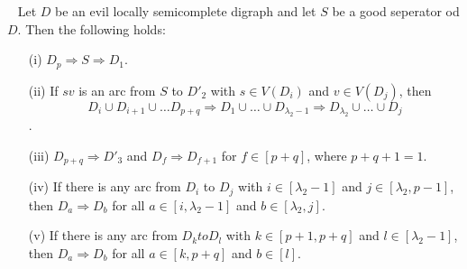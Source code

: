 \begin{lemma}~\cite{tildeDMCS}
    Let $D$ be an evil locally semicomplete digraph and let $S$ be a good seperator od $D$. Then the following holds:
    \begin{itemize}
        \item[(i)] $D_p\Rightarrow S\Rightarrow D_1$.
        \item[(ii)] If $sv$ is an arc from $S$ to $D'_2$ with $s\in V(D_i)$ and $v\in V(D_j)$, then 
        \begin{equation*}
            D_i\cup D_{i+1}\cup \dots D_{p+q}\Rightarrow D_1\cup\dots \cup D_{\lambda_2-1}\Rightarrow D_{\lambda_2}\cup \dots \cup D_j
        \end{equation*}.
        \item[(iii)] $D_{p+q}\Rightarrow D'_3$ and $D_f\Rightarrow D_{f+1}$ for $f\in [p+q]$, where $p+q+1=1$.
        \item[(iv)] If there is any arc from $D_i$ to $D_j$ with $i\in [\lambda_2-1]$ and $j\in [\lambda_2,p-1]$, then $D_a\Rightarrow D_b$ for all $a\in [i,\lambda_2-1]$ and $b\in[\lambda_2,j]$.
        \item[(v)] If there is any arc from $D_k to D_l$ with $k\in [p+1,p+q]$ and $l\in [\lambda_2-1]$, then $D_a\Rightarrow D_b$ for all $a\in [k,p+q]$ and $b\in [l]$.   
    \end{itemize}
\end{lemma}
